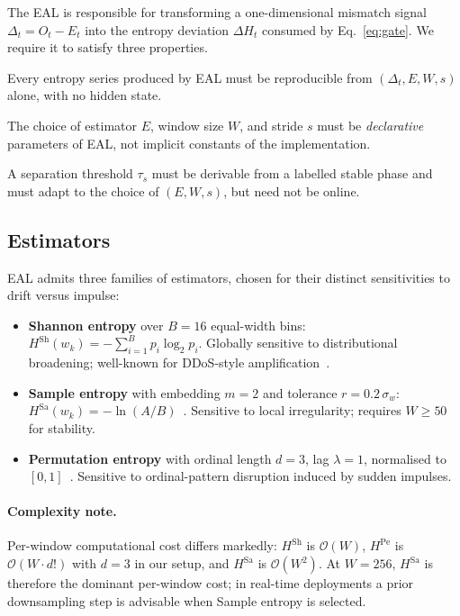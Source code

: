 \documentclass[runningheads]{llncs}
\newcommand{\Hsh}{\ensuremath{H^{\mathrm{Sh}}}}
\newcommand{\Hsa}{\ensuremath{H^{\mathrm{Sa}}}}
\newcommand{\Hpe}{\ensuremath{H^{\mathrm{Pe}}}}
\newcommand{\EntropyDeviation}{\ensuremath{\Delta H}}
\newcommand{\taus}{\ensuremath{\tau_{s}}}
\begin{document}
The EAL is responsible for transforming a one-dimensional mismatch
signal $\Delta_t = O_t - E_t$ into the entropy deviation $\EntropyDeviation_t$
consumed by Eq.~\eqref{eq:gate}. We require it to satisfy three
properties.

\begin{description}[leftmargin=*,style=nextline]
\item[P1 (Reproducibility).] Every entropy series produced by EAL must
be reproducible from $(\Delta_t, E, W, s)$ alone, with no hidden state.
\item[P2 (Parameter Awareness).] The choice of estimator $E$, window
size $W$, and stride $s$ must be \emph{declarative} parameters of EAL,
not implicit constants of the implementation.
\item[P3 (Calibrated Threshold).] A separation threshold $\taus$ must
be derivable from a labelled stable phase and must adapt to the choice
of $(E, W, s)$, but need not be online.
\end{description}

\subsection{Estimators}

EAL admits three families of estimators, chosen for their distinct
sensitivities to drift versus impulse:

\begin{itemize}[leftmargin=*]
  \item \textbf{Shannon entropy} over $B = 16$ equal-width bins:
        $\Hsh(w_k) = -\sum_{i=1}^B p_i \log_2 p_i$.
        Globally sensitive to distributional broadening; well-known for
        DDoS-style amplification~\cite{kitsune2018}.
  \item \textbf{Sample entropy} with embedding $m=2$ and tolerance
        $r = 0.2\,\sigma_w$: $\Hsa(w_k) = -\ln(A/B)$~\cite{pincus1991}.
        Sensitive to local irregularity; requires $W \geq 50$ for
        stability.
  \item \textbf{Permutation entropy} with ordinal length $d=3$, lag
        $\lambda=1$, normalised to $[0,1]$~\cite{bandt2002}.
        Sensitive to ordinal-pattern disruption induced by sudden
        impulses.
\end{itemize}

\paragraph{Complexity note.} Per-window computational cost differs
markedly: $\Hsh$ is $\mathcal{O}(W)$, $\Hpe$ is
$\mathcal{O}(W \cdot d!)$ with $d = 3$ in our setup, and $\Hsa$ is
$\mathcal{O}(W^{2})$. At $W = 256$, $\Hsa$ is therefore the dominant
per-window cost; in real-time deployments a prior downsampling step is
advisable when Sample entropy is selected.
\end{document}

